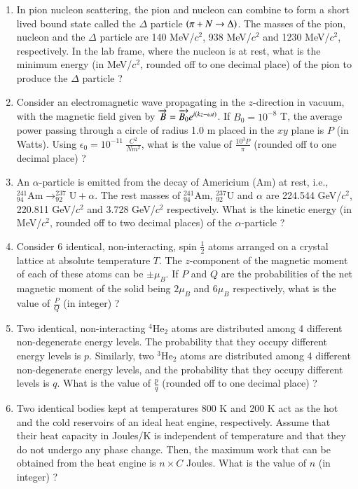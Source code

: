 \documentclass[journal]{IEEEtran}
\begin{document}
\begin{enumerate}
\item In pion nucleon scattering, the pion and nucleon can combine to form a short lived bound state called the $\Delta$ particle $\left(\pi + N \rightarrow \Delta\right)$. The masses of the pion, nucleon and the $\Delta$ particle are 140 MeV/$c^2$, 938 MeV/$c^2$ and 1230 MeV/$c^2$, respectively. In the lab frame, where the nucleon is at rest, what is the minimum energy (in MeV/$c^2$, rounded off to one decimal place) of the pion to produce the
$\Delta$ particle ? \\
\item Consider an electromagnetic wave propagating in the $z$-direction in vacuum, with the magnetic field given by $\overrightarrow{B} = \overrightarrow{B_0}e^{i\left(kz - \omega t\right)}$. If $B_0 = 10^{-8}$ T, the average power passing through a circle of radius 1.0 m placed in the $xy$ plane is $P$ (in Watts). Using $\epsilon_0 = 10^{-11}\ \frac{C^2}{N m^2}$, what is the value of $\frac{10^3P}{\pi}$ (rounded off to one decimal place) ? \\
\item An $\alpha$-particle is emitted from the decay of Americium (Am) at rest, i.e., $^{241}_{94}\text{Am} \rightarrow ^{237}_{92}\text{U} + \alpha$. The rest masses of $^{241}_{94}\text{Am}$, $^{237}_{92}\text{U}$ and $\alpha$ are 224.544 GeV/$c^2$, 220.811 GeV/$c^2$ and 3.728 GeV/$c^2$ respectively. What is the kinetic energy (in MeV/$c^2$, rounded off to two decimal places) of the $\alpha$-particle ? \\
\item Consider 6 identical, non-interacting, spin $\frac{1}{2}$ atoms arranged on a crystal lattice at absolute temperature $T$. The $z$-component of the magnetic moment of each of these atoms can be $\pm\mu_B$. If $P$ and $Q$ are the probabilities of the net magnetic moment of the solid being $2\mu_B$ and $6\mu_B$ respectively, what is the value of $\frac{P}{Q}$ (in integer) ? \\
\item Two identical, non-interacting $^4\text{He}_2$ atoms are distributed among 4 different non-degenerate energy levels. The probability that they occupy different energy levels is $p$. Similarly, two $^3\text{He}_2$ atoms are distributed among 4 different non-degenerate energy levels, and the probability that they occupy different levels is $q$. What is the value of $\frac{p}{q}$ (rounded off to one decimal place) ? \\
\item Two identical bodies kept at temperatures 800 K and 200 K act as the hot and the cold reservoirs of an ideal heat engine, respectively. Assume that their heat capacity  in Joules/K is independent of temperature and that they do not undergo any phase change. Then, the maximum work that can be obtained from the heat engine is $n \times C$ Joules. What is the value of $n$ (in integer) ? \\
			 \end{enumerate}
			 
\end{document}
